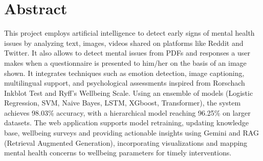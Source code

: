 

\section*{Abstract} 




\noindent
This project employs artificial intelligence to detect early signs of mental health issues by analyzing text, images, videos shared on platforms like Reddit and Twitter. It also allows to detect mental issues from PDFs and responses a user makes when a questionnaire is presented to him/her on the basis of an image shown. It integrates techniques such as emotion detection, image captioning, multilingual support, and psychological assessments inspired from Rorschach Inkblot Test and Ryff's Wellbeing Scale. Using an ensemble of models (Logistic Regression, SVM, Naive Bayes, LSTM, XGboost, Transformer), the system achieves 98.03\% accuracy, with a hierarchical model reaching 96.25\% on larger datasets. The web application supports model retraining, updating knowledge base, wellbeing surveys and providing actionable insights using Gemini and RAG (Retrieval Augmented Generation), incorporating visualizations and mapping mental health concerns to wellbeing parameters for timely interventions.



\newpage